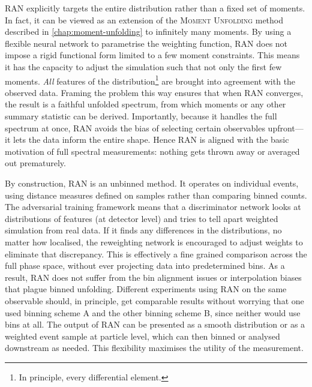 {{        RAN explicitly targets the entire distribution rather than a fixed set of moments.
        In fact, it can be viewed as an extension of the \textsc{Moment Unfolding} method described in \cref{chap:moment-unfolding} to infinitely many moments.
        By using a flexible neural network to parametrise the weighting function, RAN does not impose a rigid functional form limited to a few moment constraints.
        This means it has the capacity to adjust the simulation such that not only the first few moments.
        \emph{All} features of the distribution\footnote{In principle, every differential element.} are brought into agreement with the observed data.
        Framing the problem this way ensures that when RAN converges, the result is a faithful unfolded spectrum, from which moments or any other summary statistic can be derived.
        Importantly, because it handles the full spectrum at once, RAN avoids the bias of selecting certain observables upfront---it lets the data inform the entire shape. 
        Hence RAN is aligned with the basic motivation of full spectral measurements: nothing gets thrown away or averaged out prematurely.

        By construction, RAN is an unbinned method.
        It operates on individual events, using distance measures defined on samples rather than comparing binned counts.
        The adversarial training framework means that a discriminator network looks at distributions of features (at detector level) and tries to tell apart weighted simulation from real data.
        If it finds any differences in the distributions, no matter how localised, the reweighting network is encouraged to adjust weights to eliminate that discrepancy.
        This is effectively a fine grained comparison across the full phase space, without ever projecting data into predetermined bins.
        As a result, RAN does not suffer from the bin alignment issues or interpolation biases that plague binned unfolding.
        Different experiments using RAN on the same observable should, in principle, get comparable results without worrying that one used binning scheme A and the other binning scheme B, since neither would use bins at all.
        The output of RAN can be presented as a smooth distribution or as a weighted event sample at particle level, which can then binned or analysed downstream as needed.
        This flexibility maximises the utility of the measurement.

}}
